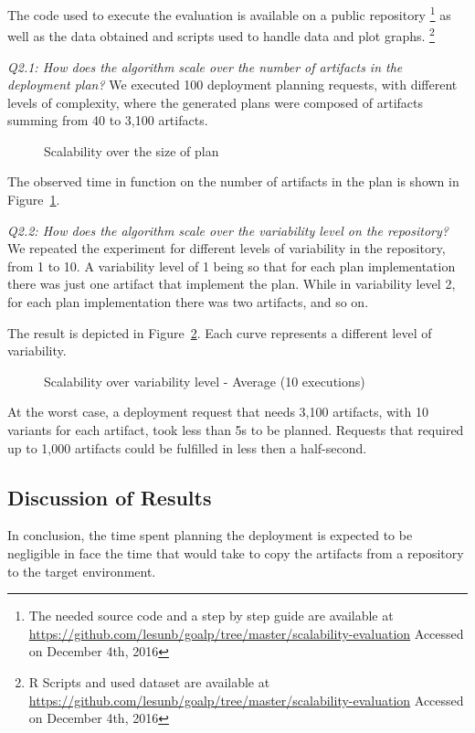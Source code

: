 The code used to execute the evaluation is available on a public repository
\footnote{The needed source code and a step by step guide are available at
\url{https://github.com/lesunb/goalp/tree/master/scalability-evaluation} Accessed on December 4th, 2016}
as well as
the data obtained and scripts used to handle data and plot graphs.
\footnote{R Scripts\cite{the_r_foundation_r_2016} and used dataset are available at
\url{https://github.com/lesunb/goalp/tree/master/scalability-evaluation} Accessed on December 4th, 2016}

\emph{Q2.1: How does the algorithm scale over the number of artifacts in the deployment plan?} We executed 100 deployment planning requests, with different levels of complexity, where the generated plans were composed of artifacts summing from 40 to 3,100 artifacts.

\begin{figure}[!htb]
  \centering
  \caption{Scalability over the size of plan}
\label{graph_plan_size_and_time}
\end{figure}

The observed time in function on the number of artifacts in the plan is shown in Figure~\ref{graph_plan_size_and_time}.

\emph{Q2.2:  How does the algorithm scale over the variability level on the repository?}
We repeated the experiment for different levels of variability in the repository, from 1 to 10. A variability level of 1 being so that for each plan implementation there was just one artifact that implement the plan. While in variability level 2, for each plan implementation there was two artifacts, and so on.

The result is depicted in Figure~\ref{graph_scalability}. Each curve represents a different level of variability.

\begin{figure}[!htb]
  \centering
  \caption{Scalability over variability level - Average (10 executions)}
\label{graph_scalability}
\end{figure}

At the worst case, a deployment request that needs 3,100 artifacts, with 10 variants for each artifact, took less than 5s to be planned. Requests that required up to 1,000 artifacts could be fulfilled in less then a half-second.

\subsection{Discussion of Results}

In conclusion, the time spent planning the deployment is expected to be negligible in face the time that would take to copy the artifacts from a repository to the target environment.

